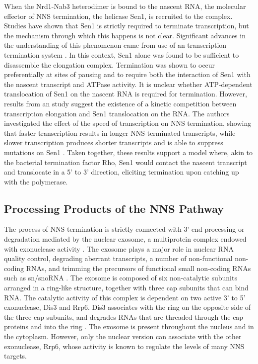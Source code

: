 When the Nrd1-Nab3 heterodimer is bound to the nascent RNA, the molecular effector of NNS termination, the helicase Sen1, is recruited to the complex. 
Studies have shown that Sen1 is strictly required to terminate transcription, but the mechanism through which this happens is not clear. 
Significant advances in the understanding of this phenomenon came from use of an \invitro{} transcription termination system \cite{porrua:2013:bacteriallike}. 
In this context, Sen1 alone was found to be sufficient to disassemble the elongation complex. Termination was shown to occur preferentially at sites of pausing and to require both the interaction of Sen1 with the nascent transcript and ATPase activity. 
It is unclear whether ATP-dependent translocation of Sen1 on the nascent RNA is required for termination. However, results from an \invivo{} study suggest the existence of a kinetic competition between transcription elongation and Sen1 translocation on the RNA. 
The authors investigated the effect of the speed of transcription on NNS termination, showing that faster transcription results in longer NNS-terminated transcripts, while slower transcription produces shorter transcripts and is able to suppress mutations on Sen1 \cite{hazelbaker:2013:kinetic}. 
Taken together, these results support a model where, akin to the bacterial termination factor Rho, Sen1 would contact the nascent transcript and translocate in a 5’ to 3’ direction, eliciting termination upon catching up with the polymerase.

\subsection{Processing Products of the NNS Pathway}

The process of NNS termination is strictly connected with 3' end processing or degradation mediated by the nuclear exosome, a multiprotein complex endowed with exonuclease activity \cite{vasiljeva:2006:nrd1}. 
The exosome plays a major role in nuclear RNA quality control, degrading aberrant transcripts, a number of non-functional non-coding RNAs, and trimming the precursors of functional small non-coding RNAs such as sn/snoRNA \cite[for review see][]{kilchert:2016:regulation}. 
The exosome is composed of six non-catalytic subunits arranged in a ring-like structure, together with three cap subunits that can bind RNA. 
The catalytic activity of this complex is dependent on two active 3' to 5' exonuclease, Dis3 and Rrp6. 
Dis3 associates with the ring on the opposite side of the three cap subunits, and degrades RNAs that are threaded through the cap proteins and into the ring \cite{makino:2015:rna}. 
The exosome is present throughout the nucleus and in the cytoplasm. 
However, only the nuclear version can associate with the other exonuclease, Rrp6, whose activity is known to regulate the levels of many NNS targets.

